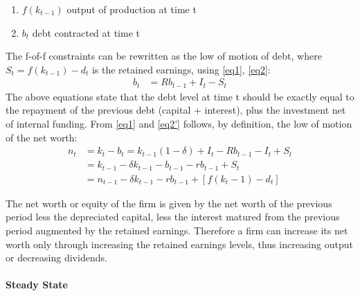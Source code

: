 \documentclass[12pt]{article}
\begin{document}
\begin{enumerate}
    \item \(f(k_{t-1}) \) output of production at time t
    \item  \(b_t\) debt contracted at time t
\end{enumerate}
The f-of-f constraints can be rewritten as the low of motion of debt, where \(S_t = f(k_{t-1}) - d_t\) is the retained
earnings, using \ref{eq1}, \ref{eq2}:
\begin{align*} 
    b_t &= R b_{t-1} + I_t - S_t \tag{2'} \label{eq2'}
\end{align*} 
The above equations state that the debt level at time t should be exactly equal to the repayment of the previous debt (capital +
interest), plus the investment net of internal funding. 
From \ref{eq1} and \ref{eq2'} follows, by definition, the low of motion of the net worth:
\begin{align*}
    n_t & = k_t- b_t = k_{t-1}(1-\delta) + I_t - R b_{t-1} - I_t + S_t \\
    &= k_{t-1} - \delta k_{t-1} - b_{t-1} - r b_{t-1}+ S_t \\
    &= n_{t-1} - \delta k_{t-1} - r b_{t-1} + \left[f\left({k_t-1}\right) - d_t \right] \tag{3} \label{eq3}
\end{align*}

The net worth or equity of the firm is given by the net worth of the previous period less the depreciated capital, less
the interest matured from the previous period augmented by the retained earnings. Therefore a firm can increase its
net worth only through increasing the retained earnings levels, thus increasing output or decreasing dividends.

\paragraph{Steady State}
\end{document}
